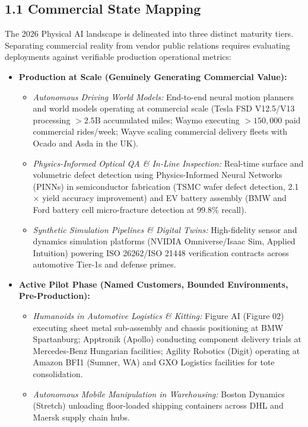 \documentclass[11pt,a4paper]{article}
\begin{document}
\subsection{1.1 Commercial State Mapping}
The 2026 Physical AI landscape is delineated into three distinct maturity tiers. Separating commercial reality from vendor public relations requires evaluating deployments against verifiable production operational metrics:

\begin{itemize}
    \item \textbf{Production at Scale (Genuinely Generating Commercial Value):}
    \begin{itemize}
        \item \textit{Autonomous Driving World Models:} End-to-end neural motion planners and world models operating at commercial scale (Tesla FSD V12.5/V13 processing $>2.5\text{B}$ accumulated miles; Waymo executing $>150,000$ paid commercial rides/week; Wayve scaling commercial delivery fleets with Ocado and Asda in the UK).
        \item \textit{Physics-Informed Optical QA \& In-Line Inspection:} Real-time surface and volumetric defect detection using Physics-Informed Neural Networks (PINNs) in semiconductor fabrication (TSMC wafer defect detection, 2.1$\times$ yield accuracy improvement) and EV battery assembly (BMW and Ford battery cell micro-fracture detection at 99.8\% recall).
        \item \textit{Synthetic Simulation Pipelines \& Digital Twins:} High-fidelity sensor and dynamics simulation platforms (NVIDIA Omniverse/Isaac Sim, Applied Intuition) powering ISO 26262/ISO 21448 verification contracts across automotive Tier-1s and defense primes.
    \end{itemize}

    \item \textbf{Active Pilot Phase (Named Customers, Bounded Environments, Pre-Production):}
    \begin{itemize}
        \item \textit{Humanoids in Automotive Logistics \& Kitting:} Figure AI (Figure 02) executing sheet metal sub-assembly and chassis positioning at BMW Spartanburg; Apptronik (Apollo) conducting component delivery trials at Mercedes-Benz Hungarian facilities; Agility Robotics (Digit) operating at Amazon BFI1 (Sumner, WA) and GXO Logistics facilities for tote consolidation.
        \item \textit{Autonomous Mobile Manipulation in Warehousing:} Boston Dynamics (Stretch) unloading floor-loaded shipping containers across DHL and Maersk supply chain hubs.
    \end{itemize}


\end{itemize}
\end{document}
